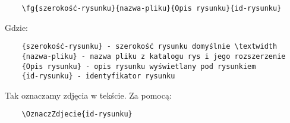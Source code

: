   \begin{verbatim}
	\fg{szerokość-rysunku}{nazwa-pliku}{Opis rysunku}{id-rysunku} 
 \end{verbatim}

 Gdzie:
\begin{verbatim}
	{szerokość-rysunku} - szerokość rysunku domyślnie \textwidth
	{nazwa-pliku} - nazwa pliku z katalogu rys i jego rozszerzenie
	{Opis rysunku} - opis rysunku wyświetlany pod rysunkiem
	{id-rysunku} - identyfikator rysunku
\end{verbatim}

 Tak oznaczamy zdjęcia  w tekście. Za pomocą:

  \begin{verbatim}
	\OznaczZdjecie{id-rysunku}
	\end{verbatim}




